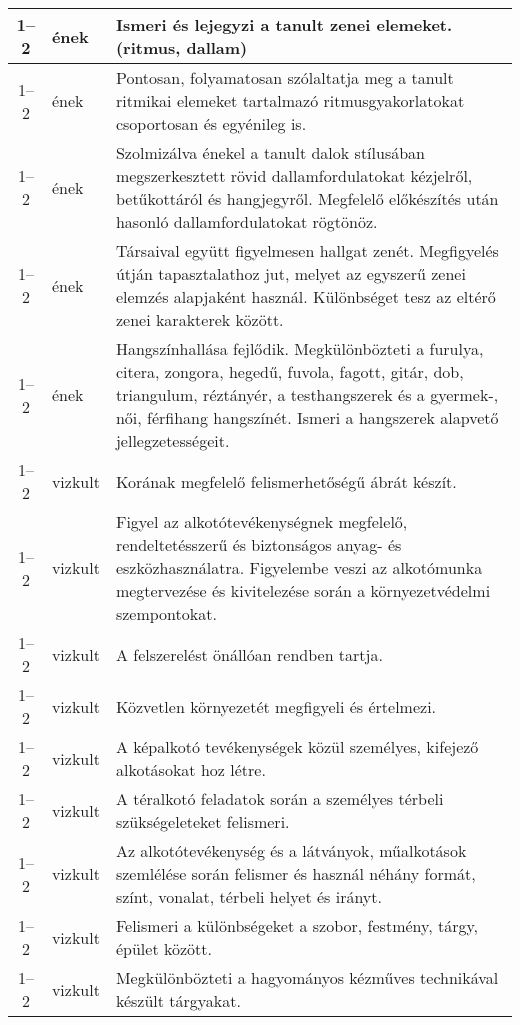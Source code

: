 \begin{small}
\begin{longtable}{c | p{2cm} |  p{11cm} }
              1--2 & ének & Ismeri és lejegyzi a tanult zenei elemeket. (ritmus, dallam) \\ \hline
              1--2 & ének & Pontosan, folyamatosan szólaltatja meg a tanult ritmikai elemeket tartalmazó ritmusgyakorlatokat csoportosan és egyénileg is. \\ \hline
              1--2 & ének & Szolmizálva énekel a tanult dalok stílusában megszerkesztett rövid dallamfordulatokat kézjelről, betűkottáról és hangjegyről. Megfelelő előkészítés után hasonló dallamfordulatokat rögtönöz. \\ \hline
              1--2 & ének & Társaival együtt figyelmesen hallgat zenét. Megfigyelés útján tapasztalathoz jut, melyet az egyszerű zenei elemzés alapjaként használ. Különbséget tesz az eltérő zenei karakterek között. \\ \hline
              1--2 & ének & Hangszínhallása fejlődik. Megkülönbözteti a furulya, citera, zongora, hegedű, fuvola, fagott, gitár, dob, triangulum, réztányér, a testhangszerek és a gyermek-, női, férfihang hangszínét. Ismeri a hangszerek alapvető jellegzetességeit. \\ \hline
              1--2 & vizkult & Korának megfelelő felismerhetőségű ábrát készít. \\ \hline
              1--2 & vizkult & Figyel az alkotótevékenységnek megfelelő, rendeltetésszerű és biztonságos anyag- és eszközhasználatra. Figyelembe veszi az alkotómunka megtervezése és kivitelezése során a környezetvédelmi szempontokat. \\ \hline
              1--2 & vizkult & A felszerelést önállóan rendben tartja. \\ \hline
              1--2 & vizkult & Közvetlen környezetét megfigyeli és értelmezi. \\ \hline
              1--2 & vizkult & A képalkotó tevékenységek közül személyes, kifejező alkotásokat hoz létre. \\ \hline
              1--2 & vizkult & A téralkotó feladatok során a személyes térbeli szükségeleteket felismeri. \\ \hline
              1--2 & vizkult & Az alkotótevékenység és a látványok, műalkotások szemlélése során felismer és használ néhány formát, színt, vonalat, térbeli helyet és irányt. \\ \hline
              1--2 & vizkult & Felismeri a különbségeket a szobor, festmény, tárgy, épület között. \\ \hline
              1--2 & vizkult & Megkülönbözteti a hagyományos kézműves technikával készült tárgyakat. \\ \hline

\end{longtable}
\end{small}

